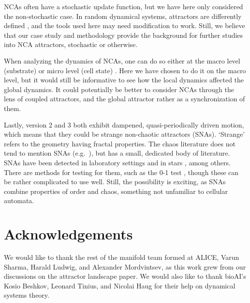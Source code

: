 \documentclass[letterpaper]{article}
\begin{document}
NCAs often have a stochastic update function, but we have here only considered the non-stochastic case. In random dynamical systems, attractors are differently defined \citep{crauel1994attractors}, and the tools used here may need modification to work. Still, we believe that our case study and methodology provide the background for further studies into NCA attractors, stochastic or otherwise.   

When analyzing the dynamics of NCAs, one can do so either at the macro level (substrate) or micro level (cell state) \citep{stovold2026landscapes}. Here we have chosen to do it on the macro level, but it would still be informative to see how the local dynamics affected the global dynamics. It could potentially be better to consider NCAs through the lens of coupled attractors, and the global attractor rather as a synchronization of them.  

Lastly, version 2 and 3 both exhibit dampened, quasi-periodically driven motion, which means that they could be strange non-chaotic attractors (SNAs). `Strange' refers to the geometry having fractal properties. The chaos literature does not tend to mention SNAs (e.g.\ \cite{strogatz2001nonlinear, datseris2022nonlinear}), but has a small, dedicated body of literature. SNAs have been detected in laboratory settings \citep{ditto1990experimental} and in stars \citep{lindner2015strange}, among others. There are methods for testing for them, such as the 0-1 test \citep{gopal2013applicability, bernardini2016overview}, though these can be rather complicated to use well. Still, the possibility is exciting, as SNAs combine properties of order and chaos, something not unfamiliar to cellular automata.   

\section{Acknowledgements}
We would like to thank the rest of the manifold team formed at ALICE, Varun Sharma, Harald Ludwig, and Alexander Mordvintsev, as this work grew from our discussions on the attractor landscape paper. We would also like to thank bioAI's Kosio Beshkov, Leonard Tinius, and Nicolai Haug for their help on dynamical systems theory.

\footnotesize

\end{document}
